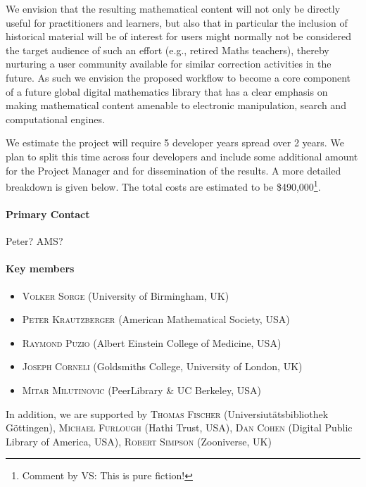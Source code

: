 \documentclass{article}
\def\comment#1#2{\typeout{Comment!}\footnote{Comment by #1: #2}}
\begin{document}
We envision that the resulting mathematical content will not only be directly
useful for practitioners and learners, but also that in particular the inclusion
of historical material will be of interest for users might normally not be
considered the target audience of such an effort (e.g., retired Maths teachers),
thereby nurturing a user community available for similar correction activities
in the future.  As such we envision the proposed workflow to become a core
component of a future global digital mathematics library that has a clear
emphasis on making mathematical content amenable to electronic manipulation,
search and computational engines.

We estimate the project will require 5 developer years spread over 2 years. We
plan to split this time across four developers and include some additional
amount for the Project Manager and for dissemination of the results. A more
detailed breakdown is given below. The total costs are estimated to be
\$490,000\comment{VS}{This is pure fiction!}.

\paragraph{Primary Contact}\label{primary-contact}

Peter? AMS?

\paragraph{Key members}\label{key-members}

\begin{itemize}\itemsep-2pt
\item \textsc{Volker Sorge} (University of Birmingham, UK)
\item \textsc{Peter Krautzberger} (American Mathematical Society, USA)
\item \textsc{Raymond Puzio} (Albert Einstein College of Medicine, USA) 
\item \textsc{Joseph Corneli} (Goldsmiths College, University of London, UK)
\item \textsc{Mitar Milutinovic} (PeerLibrary \& UC Berkeley, USA) 
\end{itemize}

In addition, we are supported by \textsc{Thomas Fischer} (Universiut{\"a}tsbibliothek
G{\"o}ttingen), 
 \textsc{Michael Furlough} (Hathi Trust, USA),
 \textsc{Dan Cohen} (Digital Public Library of America, USA),
 \textsc{Robert Simpson} (Zooniverse, UK)
\end{document}
